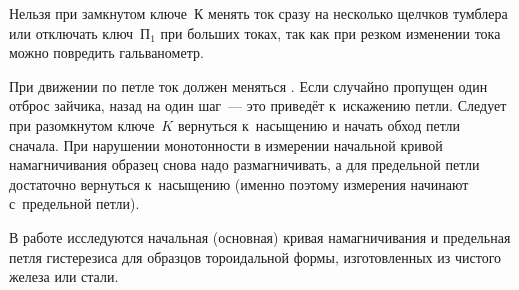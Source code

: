 Нельзя при замкнутом ключе~К менять ток сразу на несколько щелчков тумблера или
отключать ключ~$\text{П}_1$ при больших токах, так как при резком изменении
тока можно повредить гальванометр.

При движении по петле ток должен меняться .
Если случайно пропущен один отброс зайчика, 
назад на один шаг~--- это приведёт к~искажению петли. Следует при разомкнутом
ключе~$K$ вернуться к~насыщению и начать
обход петли сначала. При нарушении монотонности в измерении начальной кривой
намагничивания образец снова надо размагничивать, а для предельной петли
достаточно вернуться к~насыщению (именно поэтому измерения начинают с~предельной
петли).

\labtask

В работе исследуются начальная (основная) кривая намагничивания и предельная
петля гистерезиса для образцов тороидальной
формы, изготовленных из чистого железа или стали.

